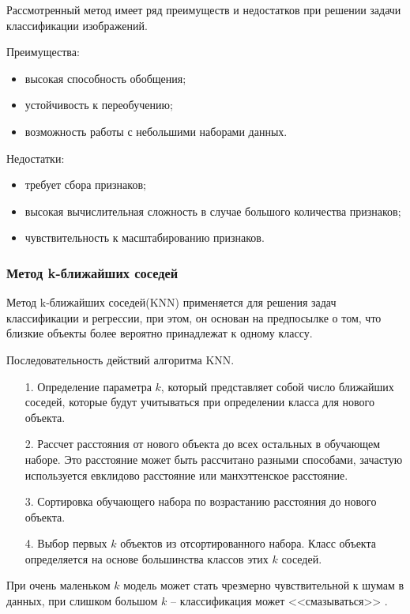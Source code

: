 Рассмотренный метод имеет ряд преимуществ и недостатков при решении задачи классификации изображений.

Преимущества:
\begin{itemize}[leftmargin=1.6\parindent, label*=---]
	\item высокая способность обобщения;
	\item устойчивость к переобучению;
	\item возможность работы с небольшими наборами данных.
\end{itemize}

Недостатки:
\begin{itemize}[leftmargin=1.6\parindent, label*=---]
	\item требует сбора признаков;
	\item высокая вычислительная сложность в случае большого количества признаков;
	\item чувствительность к масштабированию признаков.
\end{itemize}


\subsubsection*{Метод k-ближайших соседей}
Метод k-ближайших соседей(KNN) применяется для решения задач классификации и регрессии, при этом, он основан на предпосылке о том, что близкие объекты более вероятно принадлежат к одному классу.

Последовательность действий алгоритма KNN.
\begin{itemize}[leftmargin=1.6\parindent]
	\item[1.] Определение параметра $k$,  который представляет собой число ближайших соседей, которые будут учитываться при определении класса для нового объекта.
	\item[2.] Рассчет расстояния от нового объекта до всех остальных в обучающем наборе. Это расстояние может быть рассчитано разными способами, зачастую используется евклидово расстояние\cite{eu-distance} или манхэттенское расстояние\cite{ma-distance}.
	\item[3.] Сортировка обучающего набора по возрастанию расстояния до нового объекта.
	\item[4.] Выбор первых $k$ объектов из отсортированного набора. Класс объекта определяется на основе большинства классов этих $k$ соседей.
\end{itemize}

При очень маленьком $k$ модель может стать чрезмерно чувствительной к шумам в данных, при слишком большом $k$ -- классификация может <<смазываться>> .

